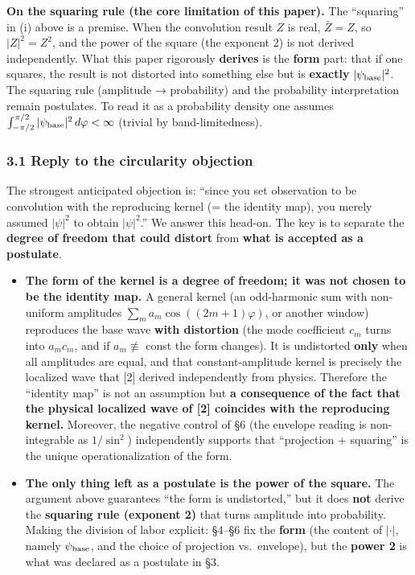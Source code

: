 \documentclass[
]{ltjsarticle}
\providecommand{\tightlist}{%
  \setlength{\itemsep}{0pt}\setlength{\parskip}{0pt}}
\begin{document}
\textbf{On the squaring rule (the core limitation of this paper).} The
``squaring'' in (i) above is a premise. When the convolution result
\(Z\) is real, \(\bar Z=Z\), so \(|Z|^2=Z^2\), and the power of the
square (the exponent 2) is not derived independently. What this paper
rigorously \textbf{derives} is the \textbf{form} part: that if one
squares, the result is not distorted into something else but is
\textbf{exactly} \(|\psi_{\rm base}|^2\). The squaring rule (amplitude →
probability) and the probability interpretation remain postulates. To
read it as a probability density one assumes
\(\int_{-\pi/2}^{\pi/2}|\psi_{\rm base}|^2\,d\varphi<\infty\) (trivial
by band-limitedness).

\subsubsection{3.1 Reply to the circularity
objection}\label{reply-to-the-circularity-objection}

The strongest anticipated objection is: ``since you set observation to
be convolution with the reproducing kernel (= the identity map), you
merely assumed \(|\psi|^2\) to obtain \(|\psi|^2\).'' We answer this
head-on. The key is to separate the \textbf{degree of freedom that could
distort} from \textbf{what is accepted as a postulate}.

\begin{itemize}
\tightlist
\item
  \textbf{The form of the kernel is a degree of freedom; it was not
  chosen to be the identity map.} A general kernel (an odd-harmonic sum
  with non-uniform amplitudes \(\sum_m a_m\cos((2m+1)\varphi)\), or
  another window) reproduces the base wave \textbf{with distortion} (the
  mode coefficient \(c_m\) turns into \(a_m c_m\), and if
  \(a_m\not\equiv\) const the form changes). It is undistorted
  \textbf{only} when all amplitudes are equal, and that
  constant-amplitude kernel is precisely the localized wave that {[}2{]}
  derived independently from physics. Therefore the ``identity map'' is
  not an assumption but \textbf{a consequence of the fact that the
  physical localized wave of {[}2{]} coincides with the reproducing
  kernel.} Moreover, the negative control of §6 (the envelope reading is
  non-integrable as \(1/\sin^2\)) independently supports that
  ``projection + squaring'' is the unique operationalization of the
  form.
\item
  \textbf{The only thing left as a postulate is the power of the
  square.} The argument above guarantees ``the form is undistorted,''
  but it does \textbf{not} derive the \textbf{squaring rule (exponent
  2)} that turns amplitude into probability. Making the division of
  labor explicit: §4--§6 fix the \textbf{form} (the content of
  \(|\cdot|\), namely \(\psi_{\rm base}\), and the choice of projection
  vs.~envelope), but the \textbf{power 2} is what was declared as a
  postulate in §3.
\end{itemize}
\end{document}

